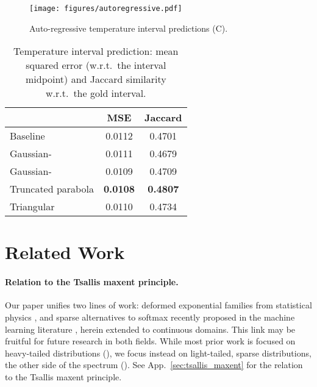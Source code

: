 \documentclass{article}
\begin{document}
{\begin{figure}[h]\centering
\texttt{[image: figures/autoregressive.pdf]}
\vspace{-0.5cm}
\caption{Auto-regressive temperature interval predictions (C).}
\end{figure}


\begin{table}[t]
    \caption{\label{tab:weather}Temperature interval prediction: mean squared error (w.r.t.\ the interval midpoint) and Jaccard similarity w.r.t.\ the gold interval.}
    \vskip 0.15in
    \begin{small}
    \begin{center}
    \begin{tabular}{lcc}
    \toprule
    & MSE & {\sc Jaccard} \\
    \midrule
    Baseline
    & 0.0112 & 0.4701 \\
    Gaussian-
    & 0.0111 & 0.4679 \\
    Gaussian-
    & 0.0109 & 0.4709 \\
    Truncated parabola
    & \textbf{0.0108} & \textbf{0.4807} \\
    Triangular
    & 0.0110 & 0.4734 \\
    \bottomrule
    \end{tabular}
    \end{center}
    \end{small}
    \vskip -0.2in
\end{table}
}

\section{Related Work}\label{sec:related}
\paragraph{Relation to the Tsallis maxent principle.}
Our paper unifies two lines of work: deformed exponential families from statistical physics \citep{Tsallis1988,naudts2009q,amari2011geometry}, and sparse alternatives to softmax recently proposed in the machine learning literature \citep{Martins2016ICML,peters2019sparse,blondel2020learning}, herein extended to continuous domains. This link may be fruitful for future research in both fields. 
While most prior work is focused on heavy-tailed distributions (), we focus instead on light-tailed, sparse distributions, the other side of the spectrum (). See App.~\ref{sec:tsallis_maxent} for the relation to the Tsallis maxent principle.  
\end{document}
